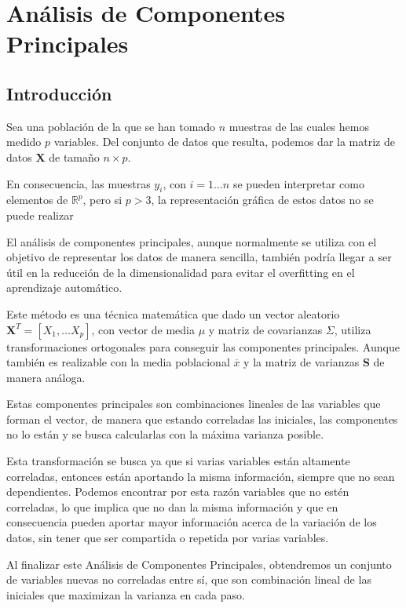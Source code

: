 \chapter{Análisis de Componentes Principales}
\section{Introducción}

\noindent Sea una población de la que se han tomado $n$ muestras de las cuales hemos medido $p$ variables. Del conjunto de datos que resulta, podemos dar la matriz de datos $\mathbf{X}$ de tamaño $n\times p$. 

En consecuencia, las muestras $y_i$, con $i=1\ldots n$ se pueden interpretar como elementos de $\mathbb{R}^p$, pero si $p>3$, la representación gráfica de estos datos no se puede realizar

El análisis de componentes principales, aunque normalmente se utiliza con el objetivo de representar los datos de manera sencilla, también podría llegar a ser útil en la reducción de la dimensionalidad para evitar el overfitting en el aprendizaje automático. 

Este método es una técnica matemática que dado un vector aleatorio $\textbf{X}^T=[X_1,\ldots X_p]$, con vector de media $\mu$ y matriz de covarianzas $\Sigma$, utiliza transformaciones ortogonales para conseguir las componentes principales. Aunque también es realizable con la media poblacional $\overline{x}$ y la matriz de varianzas \textbf{S} de manera análoga.  

Estas componentes principales son combinaciones lineales de las variables que forman el vector, de manera que estando correladas las iniciales, las componentes no lo están y se busca calcularlas con la máxima varianza posible. 

Esta transformación se busca ya que si varias variables están altamente correladas, entonces están aportando la misma información, siempre que no sean dependientes. Podemos encontrar por esta razón variables que no estén correladas, lo que implica que no dan la misma información y que en consecuencia pueden aportar mayor información acerca de la variación de los datos, sin tener que ser compartida o repetida por varias variables. 

Al finalizar este Análisis de Componentes Principales, obtendremos un conjunto de variables nuevas no correladas entre sí, que son combinación lineal de las iniciales que maximizan la varianza en cada paso.

